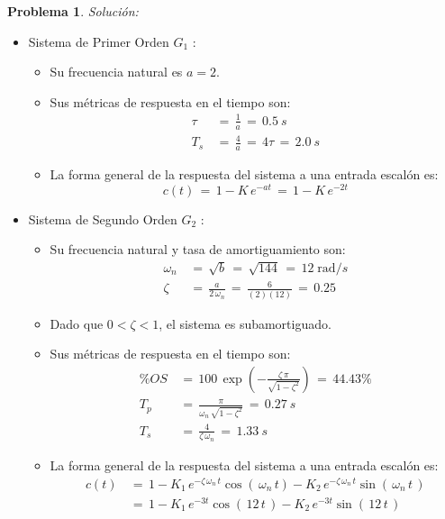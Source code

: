 \documentclass[ a4paper, twoside, 11pt]{article}
\theoremstyle{definition}
\newtheorem{problem}[definition]{Problema}
\begin{document}
\begin{problem}
\emph{Soluci\'on:}
\begin{itemize}
\item Sistema de Primer Orden $G_1$ : 
\begin{itemize}
\item Su frecuencia natural es $a = 2$. 
\item Sus m\'etricas de respuesta en el tiempo son: 
\begin{align*}
\tau \, & = \, \frac{1}{a} \, = \, 0.5 \: s \\[1ex]
T_s \,  & = \, \frac{4}{a} \, = \, 4 \tau \, = \, 2.0 \: s
\end{align*}
\item La forma general de la respuesta del sistema a una entrada escal\'on es: 
\[
c(t) \, = \, 1 - K \, e^{-at} \, = \, 1 - K \, e^{-2t}
\]
\end{itemize}
\item Sistema de Segundo Orden $G_2$ : 
\begin{itemize}
\item Su frecuencia natural y tasa de amortiguamiento son: 
\begin{align*}
\omega_n \, & = \, \sqrt{b} \, = \, \sqrt{144} \, = \, 12 \; \text{rad}/s \\
\zeta \,    & = \, \frac{a}{ 2 \, \omega_n } \, = \, \frac{6}{ (2)(12) } \, = \, 0.25
\end{align*}
\item Dado que $0 < \zeta < 1$, el sistema es subamortiguado. 
\item Sus m\'etricas de respuesta en el tiempo son: 
\begin{align*}
\% OS \, 
& = \, 100 \, \exp \left( -\frac{ \zeta \, \pi }{ \sqrt{1 - \zeta^2} } \right) 
\, = \, 44.43 \% \\[1ex]
T_p \, & = \, \frac{\pi}{ \omega_n \, \sqrt{1 - \zeta^2} } \, = \, 0.27 \: s \\[1ex]
T_s \, & = \, \frac{4}{ \zeta \, \omega_n } \, = \, 1.33 \: s
\end{align*}
\item La forma general de la respuesta del sistema a una entrada escal\'on es: 
\begin{align*}
c(t) \, 
& = \, 1 - K_1 \, e^{ - \zeta \, \omega_n \, t } \cos( \, \omega_n \, t ) 
- K_2 \, e^{ - \zeta \, \omega_n \, t } \sin( \, \omega_n \, t \, ) \\
& = \, 1 - K_1 \, e^{ -3t } \cos( \, 12 \, t \, ) 
- K_2 \, e^{ -3t } \sin( \, 12 \, t \, ) 

\end{align*}
\end{itemize}
\end{itemize}
\end{problem}
\end{document}
